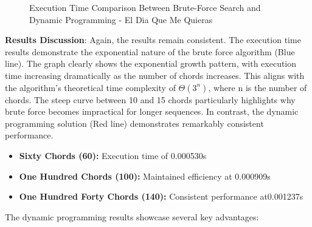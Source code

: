 \documentclass[conference]{IEEEtran}
\begin{document}
\begin{figure}[H]
    \centering
    \caption{Execution Time Comparison Between Brute-Force Search and Dynamic Programming - El Dia Que Me Quieras}
    \label{fig:execution-time-2}
\end{figure}

\textbf{Results Discussion}: Again, the results remain consistent. The execution time results demonstrate the exponential nature of the brute force algorithm (Blue line). 
The graph clearly shows the exponential growth pattern, with execution time increasing dramatically as the number of chords increases. This aligns with the algorithm's theoretical time complexity of \(\Theta(3^n)\), where n is the number of chords. The steep curve between 10 and 15 chords particularly highlights why brute force becomes impractical for longer sequences.
In contrast, the dynamic programming solution (Red line) demonstrates remarkably consistent performance.

\begin{itemize}
    \item \textbf{Sixty Chords (60):} Execution time of 0.000530s
    \item \textbf{One Hundred Chords (100):} Maintained efficiency at 0.000909s
    \item \textbf{One Hundred Forty Chords (140):} Consistent performance at0.001237s
\end{itemize}

The dynamic programming results showcase several key advantages:
\end{document}
